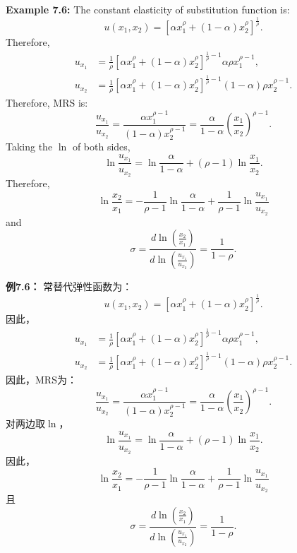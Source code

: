 \begin{original}
\textbf{Example 7.6:} The constant elasticity of substitution function is:
\[
u(x_1, x_2) = [\alpha x_1^\rho + (1-\alpha) x_2^\rho]^{\frac{1}{\rho}}.
\]
Therefore,
\begin{align*}
u_{x_1} &= \frac{1}{\rho} [\alpha x_1^\rho + (1-\alpha) x_2^\rho]^{\frac{1}{\rho}-1} \alpha \rho x_1^{\rho-1},\\
u_{x_2} &= \frac{1}{\rho} [\alpha x_1^\rho + (1-\alpha) x_2^\rho]^{\frac{1}{\rho}-1} (1-\alpha) \rho x_2^{\rho-1}.
\end{align*}
Therefore, MRS is:
\[
\frac{u_{x_1}}{u_{x_2}} = \frac{\alpha x_1^{\rho-1}}{(1-\alpha) x_2^{\rho-1}} = \frac{\alpha}{1-\alpha}\left(\frac{x_1}{x_2}\right)^{\rho-1}.
\]
Taking the $\ln$ of both sides,
\[
\ln\frac{u_{x_1}}{u_{x_2}} = \ln\frac{\alpha}{1-\alpha} + (\rho-1)\ln\frac{x_1}{x_2}.
\]
Therefore,
\[
\ln\frac{x_2}{x_1} = -\frac{1}{\rho-1}\ln\frac{\alpha}{1-\alpha} + \frac{1}{\rho-1}\ln\frac{u_{x_1}}{u_{x_2}}
\]
and
\[
\sigma = \frac{d\ln\!\left(\frac{x_2}{x_1}\right)}{d\ln\!\left(\frac{u_{x_1}}{u_{x_2}}\right)} = \frac{1}{1-\rho}.
\]
\end{original}
\begin{translation}
\textbf{例7.6：} 常替代弹性函数为：
\[
u(x_1, x_2) = [\alpha x_1^\rho + (1-\alpha) x_2^\rho]^{\frac{1}{\rho}}.
\]
因此，
\begin{align*}
u_{x_1} &= \frac{1}{\rho} [\alpha x_1^\rho + (1-\alpha) x_2^\rho]^{\frac{1}{\rho}-1} \alpha \rho x_1^{\rho-1},\\
u_{x_2} &= \frac{1}{\rho} [\alpha x_1^\rho + (1-\alpha) x_2^\rho]^{\frac{1}{\rho}-1} (1-\alpha) \rho x_2^{\rho-1}.
\end{align*}
因此，MRS为：
\[
\frac{u_{x_1}}{u_{x_2}} = \frac{\alpha x_1^{\rho-1}}{(1-\alpha) x_2^{\rho-1}} = \frac{\alpha}{1-\alpha}\left(\frac{x_1}{x_2}\right)^{\rho-1}.
\]
对两边取$\ln$，
\[
\ln\frac{u_{x_1}}{u_{x_2}} = \ln\frac{\alpha}{1-\alpha} + (\rho-1)\ln\frac{x_1}{x_2}.
\]
因此，
\[
\ln\frac{x_2}{x_1} = -\frac{1}{\rho-1}\ln\frac{\alpha}{1-\alpha} + \frac{1}{\rho-1}\ln\frac{u_{x_1}}{u_{x_2}}
\]
且
\[
\sigma = \frac{d\ln\!\left(\frac{x_2}{x_1}\right)}{d\ln\!\left(\frac{u_{x_1}}{u_{x_2}}\right)} = \frac{1}{1-\rho}.
\]
\end{translation}


